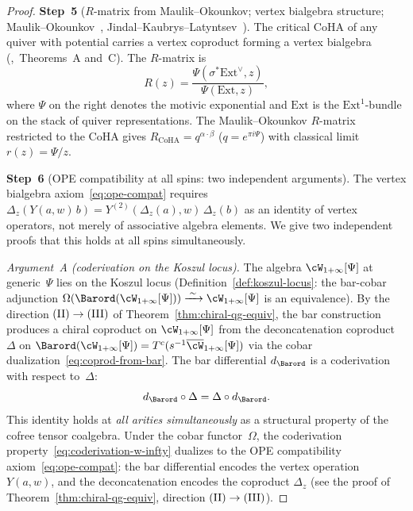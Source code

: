 \begin{proof}
\medskip
\noindent
\textbf{Step~5}
($R$-matrix from Maulik--Okounkov; vertex bialgebra
structure; Maulik--Okounkov~\cite{MO19},
Jindal--Kaubrys--Latyntsev~\cite{JKL26}).
The critical CoHA of any quiver with potential carries
a vertex coproduct forming a vertex
bialgebra (\cite{JKL26},~Theorems~A and~C). The
$R$-matrix is
\[
  R(z)
  = \frac{\Psi(\sigma^* \mathrm{Ext}^\vee, z)}
  {\Psi(\mathrm{Ext}, z)},
\]
where $\Psi$ on the right denotes the motivic exponential
and $\mathrm{Ext}$ is the $\mathrm{Ext}^1$-bundle on the
stack of quiver representations.
The Maulik--Okounkov $R$-matrix~\cite{MO19}
restricted to the CoHA gives
$R_{\mathrm{CoHA}} = q^{\alpha \cdot \beta}$
($q = e^{\pi i \Psi}$) with classical limit
$r(z) = \Psi/z$.

\medskip
\noindent
\textbf{Step~6}
(OPE compatibility at all spins: two independent
arguments).
The vertex bialgebra axiom~\eqref{eq:ope-compat}
requires $\Delta_z(Y(a,w)\,b)
= Y^{(2)}(\Delta_z(a),w)\,\Delta_z(b)$
as an identity of vertex operators, not merely of
associative algebra elements. We give two independent
proofs that this holds at all spins simultaneously.

\smallskip
\noindent\emph{Argument~A \textup{(}coderivation on the
Koszul locus\textup{)}.}
The algebra $\cW_{1+\infty}[\Psi]$ at generic~$\Psi$ lies
on the Koszul locus
\textup{(}Definition~\textup{\ref{def:koszul-locus}}:
the bar-cobar adjunction
$\Omega(\Barord(\cW_{1+\infty}[\Psi]))
\xrightarrow{\;\sim\;} \cW_{1+\infty}[\Psi]$ is an
equivalence\textup{)}. By the direction
$\textup{(II)} \to \textup{(III)}$ of
Theorem~\textup{\ref{thm:chiral-qg-equiv}}, the bar
construction produces a chiral coproduct on
$\cW_{1+\infty}[\Psi]$ from the deconcatenation coproduct
$\Delta$ on $\Barord(\cW_{1+\infty}[\Psi])
= T^c(s^{-1}\overline{\cW}_{1+\infty}[\Psi])$
via the cobar dualization~\eqref{eq:coprod-from-bar}.
The bar differential $d_{\Barord}$ is a coderivation with
respect to~$\Delta$:
\begin{equation}\label{eq:coderivation-w-infty}
  d_{\Barord} \circ \Delta
  = \Delta \circ d_{\Barord}.
\end{equation}
This identity holds at \emph{all arities
simultaneously} as a structural property of the cofree
tensor coalgebra. Under the cobar functor~$\Omega$, the
coderivation property~\eqref{eq:coderivation-w-infty}
dualizes to the OPE compatibility
axiom~\eqref{eq:ope-compat}: the bar differential
encodes the vertex operation $Y(a,w)$, and the
deconcatenation encodes the coproduct $\Delta_z$
\textup{(}see the proof of
Theorem~\textup{\ref{thm:chiral-qg-equiv}}, direction
$\textup{(II)} \to \textup{(III)}$\textup{)}.


\end{proof}
